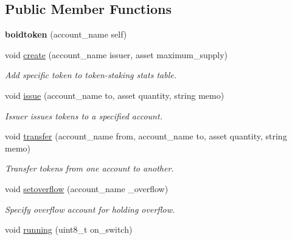 \subsection*{Public Member Functions}
\begin{DoxyCompactItemize}
\item 
{\bfseries boidtoken} (account\+\_\+name self)\hypertarget{classboidtoken_a251a26b76724620cd1eb654d32ff4972}{}\label{classboidtoken_a251a26b76724620cd1eb654d32ff4972}

\item 
void \hyperlink{classboidtoken_a09328f276ba96ecb4e2870c6b3433132}{create} (account\+\_\+name issuer, asset maximum\+\_\+supply)
\begin{DoxyCompactList}\small\item\em Add specific token to token-\/staking stats table. \end{DoxyCompactList}\item 
void \hyperlink{classboidtoken_ad4275155b85cfe7932954945f7099cc3}{issue} (account\+\_\+name to, asset quantity, string memo)
\begin{DoxyCompactList}\small\item\em Issuer issues tokens to a specified account. \end{DoxyCompactList}\item 
void \hyperlink{classboidtoken_a81244cb7a5df5ecc52f9ea38d640a763}{transfer} (account\+\_\+name from, account\+\_\+name to, asset quantity, string memo)
\begin{DoxyCompactList}\small\item\em Transfer tokens from one account to another. \end{DoxyCompactList}\item 
void \hyperlink{classboidtoken_ac56437afe05540b627b12e6c7773c793}{setoverflow} (account\+\_\+name \+\_\+overflow)
\begin{DoxyCompactList}\small\item\em Specify overflow account for holding overflow. \end{DoxyCompactList}\item 
void \hyperlink{classboidtoken_af8507dc2ddf06be4b73b5df2def38256}{running} (uint8\+\_\+t on\+\_\+switch)\hypertarget{classboidtoken_af8507dc2ddf06be4b73b5df2def38256}{}\label{classboidtoken_af8507dc2ddf06be4b73b5df2def38256}


\end{DoxyCompactItemize}
